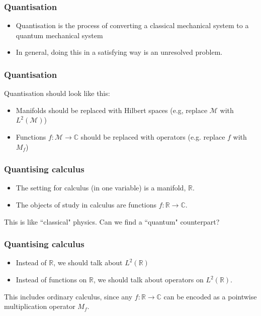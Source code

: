 \documentclass{beamer}
\newcommand{\Rl}{\mathbb{R}}
\newcommand{\Cplx}{\mathbb{C}}
\begin{document}
\begin{frame}
\frametitle{Quantisation}
\begin{itemize}
\item{} Quantisation is the process of converting a classical mechanical system to a quantum mechanical system
\item{} In general, doing this in a satisfying way is an unresolved problem.
\end{itemize}
\end{frame}

\begin{frame}
\frametitle{Quantisation}
Quantisation should look like this:
\begin{itemize}
    \item{} Manifolds should be replaced with Hilbert spaces (e.g, replace $\mathcal{M}$ with $L^2(\mathcal{M})$)
    \item{} Functions $f:\mathcal{M}\rightarrow \Cplx$ should be replaced with operators (e.g. replace $f$ with $M_f$)
\end{itemize}
\end{frame}

\begin{frame}
\frametitle{Quantising calculus}
\begin{itemize}
\item{} The setting for calculus (in one variable) is a manifold, $\Rl$.
\item{} The objects of study in calculus are functions $f:\Rl\rightarrow\Cplx$.
\end{itemize}
This is like ``classical" physics. Can we find a ``quantum" counterpart?
\end{frame}

\begin{frame}
\frametitle{Quantising calculus}
\begin{itemize}
\item{} Instead of $\Rl$, we should talk about $L^2(\Rl)$
\item{} Instead of functions on $\Rl$, we should talk about operators on $L^2(\Rl)$. 
\end{itemize}
This includes ordinary calculus, since any $f:\Rl\rightarrow\Cplx$
can be encoded as a pointwise multiplication operator $M_f$.
\end{frame}
\end{document}
